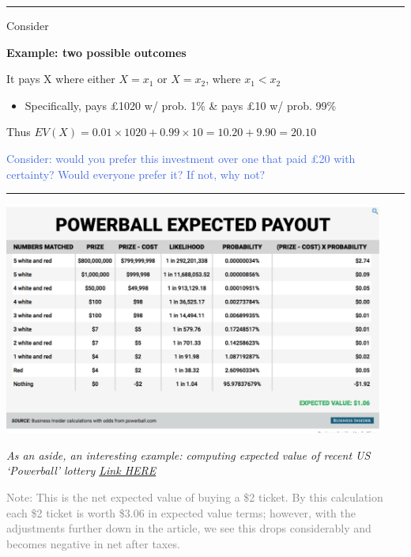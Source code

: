 \documentclass[]{article}
\providecommand{\tightlist}{%
  \setlength{\itemsep}{0pt}\setlength{\parskip}{0pt}}
\begin{document}
\begin{center}\rule{0.5\linewidth}{\linethickness}\end{center}

Consider

\textbf{Example: two possible outcomes}

It pays X where either \(X =x_1\) or \(X=x_2\), where \(x_1< x_2\)

\begin{itemize}
\tightlist
\item
  Specifically, pays \pounds1020 w/ prob. 1\% \& pays \pounds10 w/ prob. 99\%
\end{itemize}

Thus \(EV(X) = 0.01 \times 1020 + 0.99 \times 10 = 10.20 + 9.90 = 20.10\)

\textcolor{RoyalBlue}{Consider: would you prefer this investment over one that paid £20 with certainty? Would everyone prefer it? If not, why not?}

\begin{center}\rule{0.5\linewidth}{\linethickness}\end{center}

\includegraphics[height=3in]{picsfigs/powerball.png}

\emph{As an aside, an interesting example: computing expected value of recent US `Powerball' lottery \href{http://uk.businessinsider.com/powerball-lottery-expected-value-jan-9-draw-2016-1?r=US\&IR=T}{Link HERE}}

\textcolor{gray}{Note: This is the net expected value of buying a \$2 ticket. By this calculation each \$2 ticket is worth \$3.06 in expected value terms; however, with the adjustments further down in the article, we see this drops considerably and becomes negative in net after taxes.}
\end{document}
